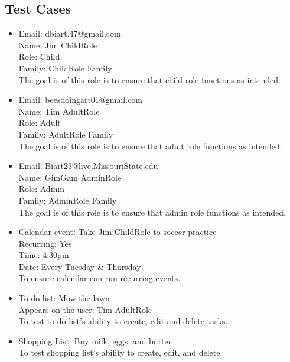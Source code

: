 \documentclass[12pt]{article}
\begin{document}
\subsection{Test Cases}
\begin{itemize}
    \item Email: dbiart.47@gmail.com \\ Name: Jim ChildRole \\ Role: Child \\ Family: ChildRole Family \\ The goal is of this role is to ensure that child role functions as intended. 
    \item Email: beesdoingart01@gmail.com \\ Name: Tim AdultRole \\ Role: Adult \\ Family: AdultRole Family \\ The goal is of this role is to ensure that adult role functions as intended. 
    \item Email: Biart23@live.MissouriState.edu \\ Name: GimGam AdminRole \\ Role: Admin \\Family: AdminRole Family \\ The goal is of this role is to ensure that admin role functions as intended.
    \item Calendar event: Take Jim ChildRole to soccer practice \\ Recurring: Yes \\ Time: 4:30pm \\ Date: Every Tuesday & Thursday \\ To ensure calendar can run recurring events.
    \item To do list: Mow the lawn \\ Appears on the user: Tim AdultRole \\ To test to do list's ability to create, edit and delete tasks. 
    \item Shopping List: Buy milk, eggs, and butter \\ To test shopping list's ability to create, edit, and delete. 
\end{itemize}
\end{document}
